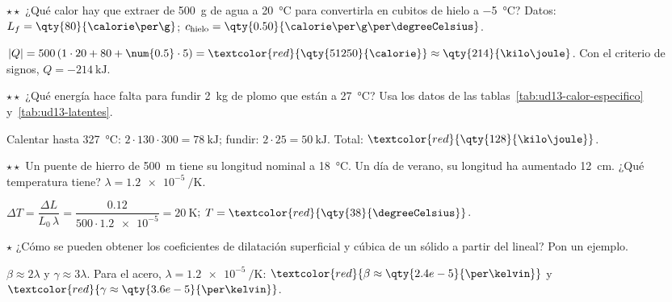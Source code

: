 \begin{exercise}
    \(\star\star\) ¿Qué calor hay que extraer de \qty{500}{\g} de agua a \qty{20}{\degreeCelsius} para convertirla en cubitos de
    hielo a \qty{-5}{\degreeCelsius}? Datos: \(L_f = \qty{80}{\calorie\per\g}\); \(c_{\text{hielo}} =
    \qty{0.50}{\calorie\per\g\per\degreeCelsius}\).
    \begin{solu}
        \(|Q| = 500\,(1 \cdot 20 + 80 + \num{0.5} \cdot 5) = \textcolor{red}{\qty{51250}{\calorie}} \approx \qty{214}{\kilo\joule}\).
        Con el criterio de signos, \(Q = \qty{-214}{\kilo\joule}\).
    \end{solu}
\end{exercise}

\begin{exercise}
    \(\star\star\) ¿Qué energía hace falta para fundir \qty{2}{\kg} de plomo que están a \qty{27}{\degreeCelsius}? Usa los datos de las
    tablas~\ref{tab:ud13-calor-especifico} y~\ref{tab:ud13-latentes}.
    \begin{solu}
        Calentar hasta \qty{327}{\degreeCelsius}: \(2 \cdot 130 \cdot 300 = \qty{78}{\kilo\joule}\); fundir: \(2 \cdot 25 =
        \qty{50}{\kilo\joule}\). Total: \(\textcolor{red}{\qty{128}{\kilo\joule}}\).
    \end{solu}
\end{exercise}

\begin{exercise}
    \(\star\star\) Un puente de hierro de \qty{500}{\m} tiene su longitud nominal a \qty{18}{\degreeCelsius}. Un día de verano, su
    longitud ha aumentado \qty{12}{\cm}. ¿Qué temperatura tiene? \(\lambda = \qty{1.2e-5}{\per\kelvin}\).
    \begin{solu}
        \(\Delta T = \dfrac{\Delta L}{L_0\,\lambda} = \dfrac{\num{0.12}}{500 \cdot \num{1.2e-5}} = \qty{20}{\kelvin}\);
        \(T = \textcolor{red}{\qty{38}{\degreeCelsius}}\).
    \end{solu}
\end{exercise}

\begin{exercise}
    \(\star\) ¿Cómo se pueden obtener los coeficientes de dilatación superficial y cúbica de un sólido a partir del lineal? Pon un
    ejemplo.
    \begin{solu}
        \(\beta \approx 2\lambda\) y \(\gamma \approx 3\lambda\). Para el acero, \(\lambda = \qty{1.2e-5}{\per\kelvin}\):
        \(\textcolor{red}{\beta \approx \qty{2.4e-5}{\per\kelvin}}\) y \(\textcolor{red}{\gamma \approx \qty{3.6e-5}{\per\kelvin}}\).
    \end{solu}
\end{exercise}

